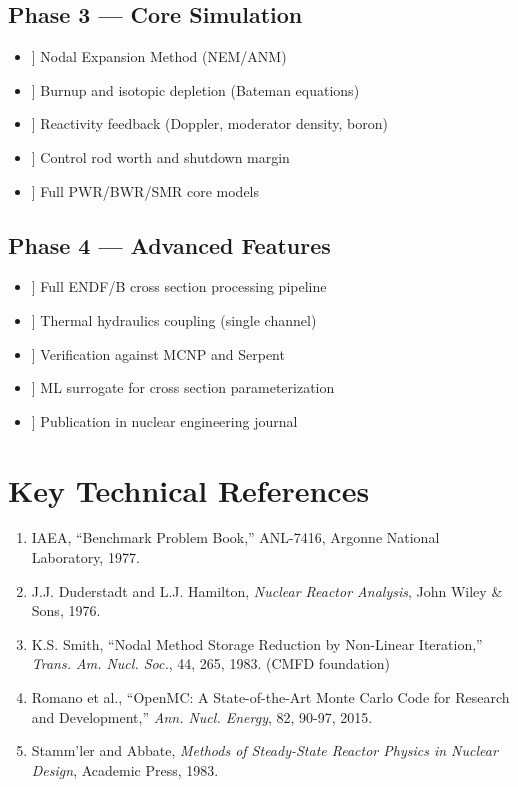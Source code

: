 \documentclass[12pt,a4paper]{article}
\begin{document}
\subsection{Phase 3 --- Core Simulation}

\begin{itemize}[leftmargin=*]
    \item[[TODO]] Nodal Expansion Method (NEM/ANM)
    \item[[TODO]] Burnup and isotopic depletion (Bateman equations)
    \item[[TODO]] Reactivity feedback (Doppler, moderator density, boron)
    \item[[TODO]] Control rod worth and shutdown margin
    \item[[TODO]] Full PWR/BWR/SMR core models
\end{itemize}

\subsection{Phase 4 --- Advanced Features}

\begin{itemize}[leftmargin=*]
    \item[[TODO]] Full ENDF/B cross section processing pipeline
    \item[[TODO]] Thermal hydraulics coupling (single channel)
    \item[[TODO]] Verification against MCNP and Serpent
    \item[[TODO]] ML surrogate for cross section parameterization
    \item[[TODO]] Publication in nuclear engineering journal
\end{itemize}

\section{Key Technical References}

\begin{enumerate}
    \item IAEA, ``Benchmark Problem Book,'' ANL-7416, Argonne National
    Laboratory, 1977.

    \item J.J. Duderstadt and L.J. Hamilton, \textit{Nuclear Reactor Analysis},
    John Wiley \& Sons, 1976.

    \item K.S. Smith, ``Nodal Method Storage Reduction by Non-Linear
    Iteration,'' \textit{Trans. Am. Nucl. Soc.}, 44, 265, 1983.
    (CMFD foundation)

    \item Romano et al., ``OpenMC: A State-of-the-Art Monte Carlo Code for
    Research and Development,'' \textit{Ann. Nucl. Energy}, 82, 90-97, 2015.

    \item Stamm'ler and Abbate, \textit{Methods of Steady-State Reactor
    Physics in Nuclear Design}, Academic Press, 1983.
\end{enumerate}
\end{document}

